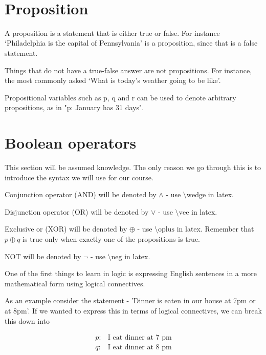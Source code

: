 \documentclass[12pt]{article}
\begin{document}
\begin{center}
\\
\vspace{1cm}
\end{center}

\vspace{0.5cm}\noindent


\section*{Proposition}

A proposition is a statement that is either true or false. For instance `Philadelphia is the capital of Pennsylvania' is a proposition, since that is a false statement. 

Things that do not have a true-false answer are not propositions. For instance, the most commonly asked `What is today's weather going to be like'.

Propositional variables such as p, q and r can be used to denote arbitrary propositions, as in "p: January has 31 days". 

\section*{Boolean operators}

This section will be assumed knowledge. The only reason we go through this is to introduce the syntax we will use for our course.

Conjunction operator (AND) will be denoted by $\wedge$ - use $\text{\textbackslash wedge}$ in latex.

Disjunction operator (OR) will be denoted by $\vee$ - use $\text{\textbackslash vee}$ in latex.

Exclusive or (XOR) will be denoted by $\oplus$ - use $\text{\textbackslash oplus}$ in latex. Remember that $p \oplus q$ is true only when exactly one of the propositions is true.

NOT will be denoted by $\neg$ -  use $\text{\textbackslash neg}$ in latex.

One of the first things to learn in logic is expressing English sentences in a more mathematical form using logical connectives.

As an example consider the statement - 'Dinner is eaten in our house at 7pm or at 8pm'. If we wanted to express this in terms of logical connectives, we can break this down into

\begin{align*}
p: & \text{I eat dinner at 7 pm} \\
q: & \text{I eat dinner at 8 pm}
\end{align*}
\end{document}
